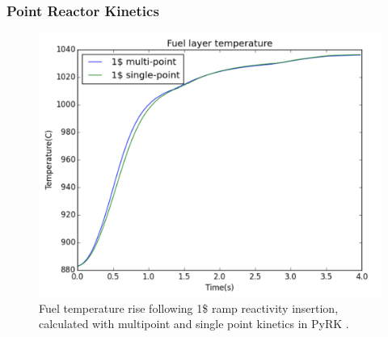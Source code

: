 \begin{frame}
        \frametitle{Point Reactor Kinetics}

               \begin{figure}[t]
                \vspace*{-0.1in}
                       \includegraphics[height=0.5\textwidth]{./images/pbfhr-multi-single-point.png}
                       \caption{Fuel temperature rise following 1\$ ramp 
                       reactivity insertion, calculated with multipoint and 
                       single point kinetics in PyRK \cite{wang_coupled_2016}.}
               \end{figure}

\end{frame}
